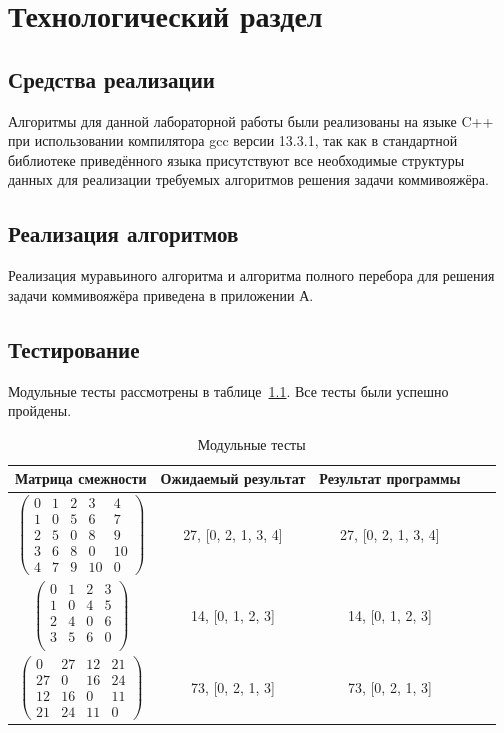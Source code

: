 \chapter{Технологический раздел}
\section{Средства реализации}
Алгоритмы для данной лабораторной работы были реализованы на языке C++ при использовании компилятора gcc версии 13.3.1, так как в стандартной библиотеке приведённого языка присутствуют все необходимые структуры данных для реализации требуемых алгоритмов решения задачи коммивояжёра.

\section{Реализация алгоритмов}
Реализация муравьиного алгоритма и алгоритма полного перебора для решения задачи коммивояжёра приведена в приложении А.

\section{Тестирование}

Модульные тесты рассмотрены в таблице~\ref{tbl:test}. Все тесты были успешно пройдены.

\begin{center}
	\captionsetup{justification=raggedright,singlelinecheck=off}
	\begin{longtable}[c]{|c|c|c|c|c|}
		\caption{Модульные тесты\label{tbl:test}} \\ \hline
		Матрица смежности & Ожидаемый результат & Результат программы \\
		\hline
		$ \begin{pmatrix}
			0 & 1 & 2 & 3 & 4 \\
			1 & 0 & 5 & 6 & 7 \\
			2 & 5 & 0 & 8 & 9 \\
			3 & 6 & 8 & 0 & 10 \\
			4 & 7 & 9 & 10 & 0 
		\end{pmatrix}$ &
		27, [0, 2, 1, 3, 4] &
		27, [0, 2, 1, 3, 4] \\
		\hline
		$ \begin{pmatrix}
			0 & 1 & 2 & 3 \\
			1 & 0 & 4 & 5 \\
			2 & 4 & 0 & 6 \\
			3 & 5 & 6 & 0 \\
		\end{pmatrix}$ &
		14, [0, 1, 2, 3] &
		14, [0, 1, 2, 3] \\
		\hline
		$ \begin{pmatrix}
			0 & 27 & 12 & 21 \\
			27 & 0 & 16 & 24 \\
			12 & 16 & 0 & 11 \\
			21 & 24 & 11 & 0 
		\end{pmatrix}$ &
		73, [0, 2, 1, 3] &
		73, [0, 2, 1, 3] \\
		\hline
	\end{longtable}
\end{center}